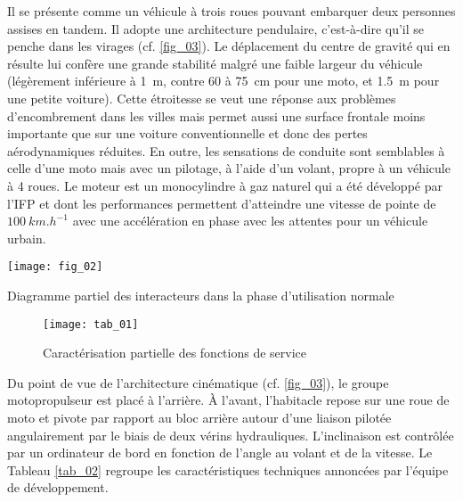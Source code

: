 Il se présente comme un véhicule à trois roues pouvant embarquer deux personnes assises en tandem. Il adopte une architecture pendulaire, c'est-à-dire qu'il se penche dans les virages (cf. \autoref{fig_03}). Le déplacement du centre de gravité qui en résulte lui confère une grande stabilité malgré une faible largeur du véhicule (légèrement inférieure à \SI{1}{m}, contre 60 à \SI{75}{cm} pour une moto, et \SI{1,5}{m} pour une petite voiture). Cette étroitesse se veut une réponse aux problèmes d'encombrement dans les villes mais permet aussi une surface frontale moins importante que sur une voiture conventionnelle et donc des pertes aérodynamiques réduites. En outre, les sensations de conduite sont semblables à celle d'une moto mais avec un pilotage, à l'aide d'un volant, propre à un véhicule à 4 roues. Le moteur est un monocylindre à gaz naturel qui a été développé par l'IFP et dont les performances permettent d'atteindre une vitesse de pointe de $\SI{100}{km.h^{-1}}$ avec une accélération en phase avec les attentes pour un véhicule urbain.

\begin{marginfigure}
\texttt{[image: fig\_02]}

\caption{Diagramme partiel des interacteurs dans la phase d'utilisation normale}
\label{fig_02}
\end{marginfigure}

\begin{figure}[!h]
\texttt{[image: tab\_01]}

\caption{Caractérisation partielle des fonctions de service}
\label{tab_01}
\end{figure}

Du point de vue de l'architecture cinématique (cf. \autoref{fig_03}), le groupe motopropulseur est placé à l'arrière. À l'avant, l'habitacle repose sur une roue de moto et pivote par rapport au bloc arrière autour d'une liaison pilotée angulairement par le biais de deux vérins hydrauliques. L'inclinaison est contrôlée par un ordinateur de bord en fonction de l'angle au volant et de la vitesse. Le Tableau \autoref{tab_02} regroupe les caractéristiques techniques annoncées par l'équipe de développement.

